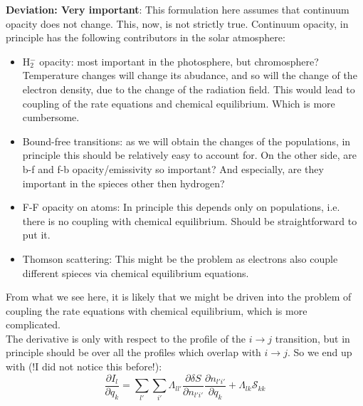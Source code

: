 \documentclass[a4paper]{article}
\begin{document}
\textbf{Deviation: Very important}: This formulation here assumes that continuum opacity does not change. This, now, is not strictly true. Continuum opacity, in principle has the following contributors in the solar atmosphere:
\begin{itemize}
\item H$_2^{-}$ opacity: most important in the photosphere, but chromosphere? Temperature changes will change its abudance, and so will the change of the electron density, due to the change of the radiation field. This would lead to coupling of the rate equations and chemical equilibrium. Which is more cumbersome. 
\item Bound-free transitions: as we will obtain the changes of the populations, in principle this should be relatively easy to account for. On the other side, are b-f and f-b opacity/emissivity so important? And especially, are they important in the spieces other then hydrogen? 
\item F-F opacity on atoms: In principle this depends only on populations, i.e. there is no coupling with chemical equilibrium. Should be straightforward to put it.
\item Thomson scattering: This might be the problem as electrons also couple different spieces via chemical equilibrium equations. 
\end{itemize}
From what we see here, it is likely that we might be driven into the problem of coupling the rate equations with chemical equilibrium, which is more complicated.
\\


The derivative is only with respect to the profile of the $i \rightarrow j$ transition, but in principle should be over all the profiles which overlap with $i \rightarrow j$. So we end up with (!I did not notice this before!):
\begin{equation}
\frac{\partial I_l}{\partial q_k} = \sum_{l'} \sum_{i'} \Lambda_{ll'} \frac{\partial \delta S}{\partial n_{l'i'}} \frac{\partial n_{l'i'}}{\partial q_k} + 
\Lambda_{lk} \mathcal{S}_{kk}
\end{equation}

\end{document}
